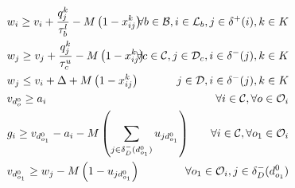 \documentclass{article}
\begin{document}
\begin{alignat}{3}
    \label{mod:c5}         & w_{i} \geq v_{i}  + \frac{q^k_j}{\tau^l_b} -M\left(1- x^{k}_{ij}\right)                                                                                                                                                                                                                          & \hspace{-20mm} \forall  b \in \mathcal{B},  i \in \mathcal{L}_{b},  j \in \delta^{+}(i), k \in K \\
    \label{mod:c6}         & w_{j} \geq v_{j}  + {  \frac{q^k_j}{\tau^u_c} -M\left(1- x^{k}_{ij}\right) }                                                                                                                                                                                                                     & \hspace{-20mm}  \forall c \in  \mathcal{C}, j \in \mathcal{D}_{c}, i \in \delta^{-}(j),  k \in K \\
    \label{mod:c7}         & w_{j} \leq v_{i}  + \Delta + M\left(1- x^{k}_{ij}\right)                                                                                                                                                                                                                                         & \hspace{-20mm}   j \in \mathcal{D},  i \in \delta^{-}(j),  k \in K                               \\
    \label{mod:c8}         & v_{d^0_{o}} \geq a_i                                                                                                                                                                                                                                                                             & \hspace{-20mm} \forall  i \in \mathcal{C}, \forall o \in \mathcal{O}_i                           \\
    \label{mod:c9}         & g_{i} \geq v_{d^0_{o_1}} - a_i - M\left(  \sum_{ j \in \delta^{-}_{D}(d^0_{o_1})  }{u_{jd^0_{o_1}}}\right)                                                                                                                                                                                       & \hspace{-20mm}  \forall  i \in \mathcal{C}, \forall o_1 \in \mathcal{O}_i                        \\
    \label{mod:c101}       & v_{d^0_{o_1}} \geq w_j - M\left(1- u_{jd^0_{o_1}}\right)                                                                                                                                                                                                                                         & \hspace{-40mm}    \forall o_1 \in \mathcal{O}_i,  j \in \delta_{D}^{-}(d^0_{o_1})                \\

\end{alignat}
\end{document}
